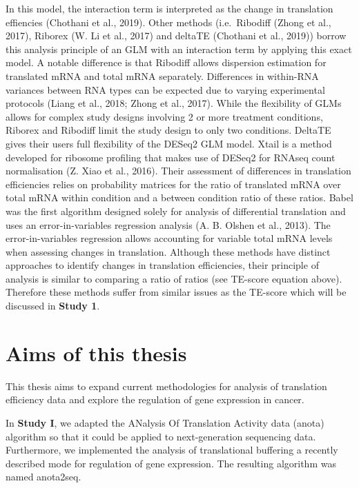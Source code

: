 \documentclass[12pt,openany]{book}
\begin{document}
In this model, the interaction term is interpreted as the change in
translation effiencies (Chothani et al., 2019). Other methods
(i.e.~Ribodiff (Zhong et al., 2017), Riborex (W. Li et al., 2017) and
deltaTE (Chothani et al., 2019)) borrow this analysis principle of an
GLM with an interaction term by applying this exact model. A notable
difference is that Ribodiff allows dispersion estimation for translated
mRNA and total mRNA separately. Differences in within-RNA variances
between RNA types can be expected due to varying experimental protocols
(Liang et al., 2018; Zhong et al., 2017). While the flexibility of GLMs
allows for complex study designs involving 2 or more treatment
conditions, Riborex and Ribodiff limit the study design to only two
conditions. DeltaTE gives their users full flexibility of the DESeq2 GLM
model. Xtail is a method developed for ribosome profiling that makes use
of DESeq2 for RNAseq count normalisation (Z. Xiao et al., 2016). Their
assessment of differences in translation efficiencies relies on
probability matrices for the ratio of translated mRNA over total mRNA
within condition and a between condition ratio of these ratios. Babel
was the first algorithm designed solely for analysis of differential
translation and uses an error-in-variables regression analysis (A. B.
Olshen et al., 2013). The error-in-variables regression allows
accounting for variable total mRNA levels when assessing changes in
translation. Although these methods have distinct approaches to identify
changes in translation efficiencies, their principle of analysis is
similar to comparing a ratio of ratios (see TE-score equation above).
Therefore these methods suffer from similar issues as the TE-score which
will be discussed in \textbf{Study 1}.

\chapter{Aims of this thesis}

This thesis aims to expand current methodologies for analysis of
translation efficiency data and explore the regulation of gene
expression in cancer.

In \textbf{Study I}, we adapted the ANalysis Of Translation Activity
data (anota) algorithm so that it could be applied to next-generation
sequencing data. Furthermore, we implemented the analysis of
translational buffering a recently described mode for regulation of gene
expression. The resulting algorithm was named anota2seq.
\end{document}
